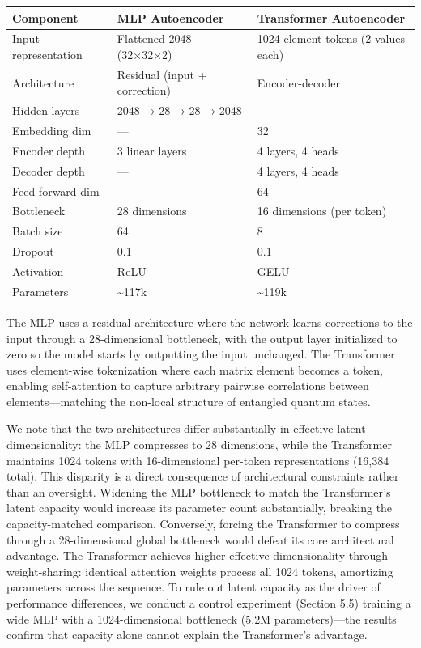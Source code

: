 \documentclass[11pt]{article}
\begin{document}
\begin{center}
\begin{tabular}{lll}
Component & MLP Autoencoder & Transformer Autoencoder\\
\hline
Input representation & Flattened 2048 (32×32×2) & 1024 element tokens (2 values each)\\
Architecture & Residual (input + correction) & Encoder-decoder\\
Hidden layers & 2048 → 28 → 28 → 2048 & —\\
Embedding dim & — & 32\\
Encoder depth & 3 linear layers & 4 layers, 4 heads\\
Decoder depth & — & 4 layers, 4 heads\\
Feed-forward dim & — & 64\\
Bottleneck & 28 dimensions & 16 dimensions (per token)\\
Batch size & 64 & 8\\
Dropout & 0.1 & 0.1\\
Activation & ReLU & GELU\\
Parameters & \textasciitilde{}117k & \textasciitilde{}119k\\
\end{tabular}
\end{center}

The MLP uses a residual architecture where the network learns corrections to the input through a 28-dimensional bottleneck, with the output layer initialized to zero so the model starts by outputting the input unchanged. The Transformer uses element-wise tokenization where each matrix element becomes a token, enabling self-attention to capture arbitrary pairwise correlations between elements—matching the non-local structure of entangled quantum states.



We note that the two architectures differ substantially in effective latent dimensionality: the MLP compresses to 28 dimensions, while the Transformer maintains 1024 tokens with 16-dimensional per-token representations (16,384 total). This disparity is a direct consequence of architectural constraints rather than an oversight. Widening the MLP bottleneck to match the Transformer's latent capacity would increase its parameter count substantially, breaking the capacity-matched comparison. Conversely, forcing the Transformer to compress through a 28-dimensional global bottleneck would defeat its core architectural advantage. The Transformer achieves higher effective dimensionality through weight-sharing: identical attention weights process all 1024 tokens, amortizing parameters across the sequence. To rule out latent capacity as the driver of performance differences, we conduct a control experiment (Section 5.5) training a wide MLP with a 1024-dimensional bottleneck (5.2M parameters)—the results confirm that capacity alone cannot explain the Transformer's advantage.
\end{document}
